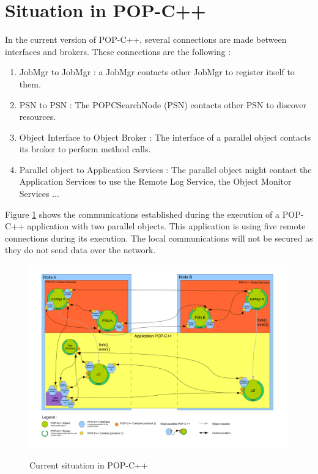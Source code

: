\pagebreak
\section{Situation in POP-C++}



In the current version of POP-C++, several connections are made between interfaces and brokers. These connections are the following : 
\begin{enumerate}
\item JobMgr to JobMgr : a JobMgr contacts other JobMgr to register itself to them.
\item PSN to PSN : The POPCSearchNode (PSN) contacts other PSN to discover resources.
\item Object Interface to Object Broker : The interface of a parallel object contacts its broker to perform method calls.
\item Parallel object to Application Services : The parallel object might contact the Application Services to use the Remote Log Service, the Object Monitor Services ...
\end{enumerate}

Figure \ref{fig:crt_sit} shows the communications established during the execution of a POP-C++ application with two parallel objects. This application is using five remote connections during its execution. The local communications will not be secured as they do not send data over the network.

\begin{figure}[ht]
	\caption{Current situation in POP-C++}
  	\centering
	\includegraphics[width=1.0\textwidth]{../popc_crt_situation.pdf}
	\label{fig:crt_sit}
\end{figure}

